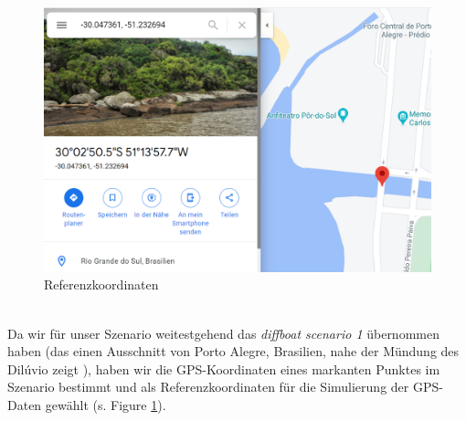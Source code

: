 \documentclass[conference]{IEEEtran}
\begin{document}
\begin{figure}
	\includegraphics[width=\linewidth]{reference.png}
	\caption{Referenzkoordinaten}
	\label{reference}
\end{figure}\\
Da wir für unser Szenario weitestgehend das \textit{diffboat scenario 1} übernommen haben (das einen Ausschnitt von Porto Alegre, Brasilien, nahe der Mündung des Dilúvio zeigt \cite{b6}), haben wir die GPS-Koordinaten eines markanten Punktes im Szenario bestimmt und als Referenzkoordinaten für die Simulierung der GPS-Daten gewählt (s. Figure \ref{reference}).
\end{document}
